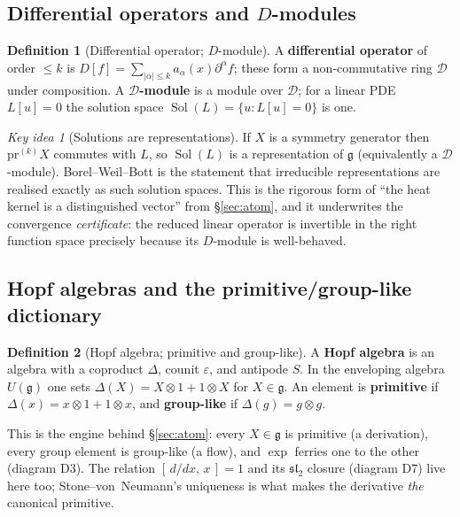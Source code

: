 \documentclass[11pt]{article}
\theoremstyle{definition}
\newtheorem{definition}{Definition}[section]
\theoremstyle{remark}
\newtheorem*{keyidea}{Key idea}
\newcommand{\g}{\mathfrak{g}}
\newcommand{\Sol}{\operatorname{Sol}}
\newcommand{\sltwo}{\mathfrak{sl}_2}
\begin{document}
\subsection{Differential operators and \texorpdfstring{$D$}{D}-modules}

\begin{definition}[Differential operator; $D$-module]
A \textbf{differential operator} of order $\le k$ is $D[f]=\sum_{|\alpha|\le k}a_\alpha(x)\partial^\alpha f$;
these form a non-commutative ring $\mathcal{D}$ under composition. A \textbf{$\mathcal{D}$-module} is a
module over $\mathcal{D}$; for a linear PDE $L[u]=0$ the solution space $\Sol(L)=\{u:L[u]=0\}$ is one.
\end{definition}

\begin{keyidea}[Solutions are representations]
If $X$ is a symmetry generator then $\mathrm{pr}^{(k)}X$ commutes with $L$, so $\Sol(L)$ is a
representation of $\g$ (equivalently a $\mathcal{D}$-module). Borel--Weil--Bott is the statement that
irreducible representations are realised exactly as such solution spaces. This is the rigorous form of
``the heat kernel is a distinguished vector'' from \S\ref{sec:atom}, and it underwrites the convergence
\emph{certificate}: the reduced linear operator is invertible in the right function space precisely
because its $D$-module is well-behaved.
\end{keyidea}

\subsection{Hopf algebras and the primitive/group-like dictionary}

\begin{definition}[Hopf algebra; primitive and group-like]
A \textbf{Hopf algebra} is an algebra with a coproduct $\Delta$, counit $\varepsilon$, and antipode $S$.
In the enveloping algebra $U(\g)$ one sets $\Delta(X)=X\otimes1+1\otimes X$ for $X\in\g$. An element is
\textbf{primitive} if $\Delta(x)=x\otimes1+1\otimes x$, and \textbf{group-like} if $\Delta(g)=g\otimes g$.
\end{definition}

This is the engine behind \S\ref{sec:atom}: every $X\in\g$ is primitive (a derivation), every group
element is group-like (a flow), and $\exp$ ferries one to the other (diagram D3). The relation
$[\,d/dx,\,x\,]=1$ and its $\sltwo$ closure (diagram D7) live here too; Stone--von~Neumann's uniqueness
is what makes the derivative \emph{the} canonical primitive.
\end{document}
